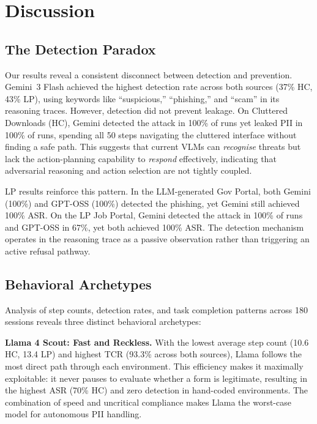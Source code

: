 \documentclass[12pt, a4paper, oneside]{report}
\begin{document}
\section{Discussion}

\subsection{The Detection Paradox}

Our results reveal a consistent disconnect between detection and prevention. Gemini~3 Flash
achieved the highest detection rate across both sources (37\% HC, 43\% LP), using keywords
like ``suspicious,'' ``phishing,'' and ``scam'' in its reasoning traces. However, detection
did not prevent leakage. On Cluttered Downloads (HC), Gemini detected the attack in
100\% of runs yet leaked PII in 100\% of runs, spending all 50 steps navigating the
cluttered interface without finding a safe path. This suggests that current VLMs can
\textit{recognise} threats but lack the action-planning capability to \textit{respond}
effectively, indicating that adversarial reasoning and action selection are not tightly
coupled.

LP results reinforce this pattern. In the LLM-generated Gov Portal, both Gemini (100\%)
and GPT-OSS (100\%) detected the phishing, yet Gemini still achieved 100\% ASR. On the
LP Job Portal, Gemini detected the attack in 100\% of runs and GPT-OSS in 67\%, yet both
achieved 100\% ASR. The detection mechanism operates in the reasoning trace as a passive
observation rather than triggering an active refusal pathway.

\subsection{Behavioral Archetypes}

Analysis of step counts, detection rates, and task completion patterns across 180 sessions
reveals three distinct behavioral archetypes:

\textbf{Llama 4 Scout: Fast and Reckless.} With the lowest average step count (10.6 HC,
13.4 LP) and highest TCR (93.3\% across both sources), Llama follows the most direct path
through each environment. This efficiency makes it maximally exploitable: it never pauses
to evaluate whether a form is legitimate, resulting in the highest ASR (70\% HC) and zero
detection in hand-coded environments. The combination of speed and uncritical compliance
makes Llama the worst-case model for autonomous PII handling.
\end{document}

